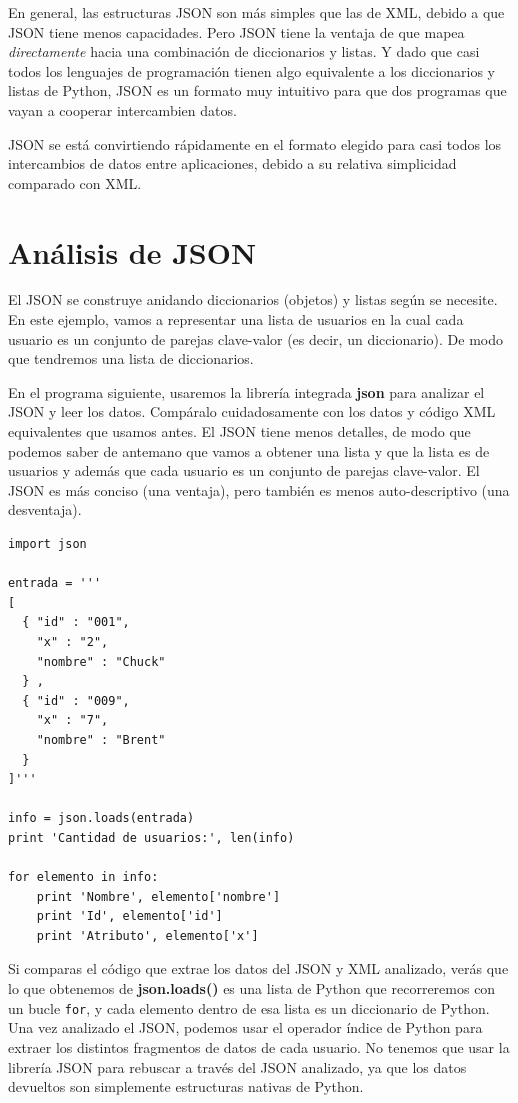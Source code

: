 En general, las estructuras JSON son más simples que las de XML, debido a que JSON tiene
menos capacidades. Pero JSON tiene la ventaja de que mapea {\em directamente} hacia una
combinación de diccionarios y listas. Y dado que casi todos los lenguajes de programación
tienen algo equivalente a los diccionarios y listas de Python, JSON es un formato
muy intuitivo para que dos programas que vayan a cooperar intercambien datos.

JSON se está convirtiendo rápidamente en el formato elegido para casi todos los intercambios
de datos entre aplicaciones, debido a su relativa simplicidad comparado con XML.

\section{Análisis de JSON}

El JSON se construye anidando diccionarios (objetos) y listas según se necesite.
En este ejemplo, vamos a representar una lista de usuarios en la cual cada usuario es un
conjunto de parejas clave-valor (es decir, un diccionario). De modo que tendremos una lista
de diccionarios.

En el programa siguiente, usaremos la librería integrada {\bf json} para analizar
el JSON y leer los datos. Compáralo cuidadosamente con los datos y código XML
equivalentes que usamos antes. El JSON tiene menos detalles, de modo que podemos saber de
antemano que vamos a obtener una lista y que la lista es de usuarios y además que cada usuario es un
conjunto de parejas clave-valor. El JSON es más conciso (una ventaja), pero también es
menos auto-descriptivo (una desventaja).

\beforeverb
\begin{verbatim}
import json

entrada = '''
[
  { "id" : "001",
    "x" : "2",
    "nombre" : "Chuck"
  } ,
  { "id" : "009",
    "x" : "7",
    "nombre" : "Brent"
  } 
]'''

info = json.loads(entrada)
print 'Cantidad de usuarios:', len(info)

for elemento in info:
    print 'Nombre', elemento['nombre']
    print 'Id', elemento['id']
    print 'Atributo', elemento['x']
\end{verbatim}
\afterverb
%
Si comparas el código que extrae los datos del JSON y XML analizado,
verás que lo que obtenemos de {\bf json.loads()} es una lista de Python
que recorreremos con un bucle {\tt for}, y cada elemento dentro de esa lista
es un diccionario de Python. Una vez analizado el JSON, podemos usar el operador
índice de Python para extraer los distintos fragmentos de datos de cada usuario. No
tenemos que usar la librería JSON para rebuscar a través del JSON analizado, ya que los
datos devueltos son simplemente estructuras nativas de Python.

